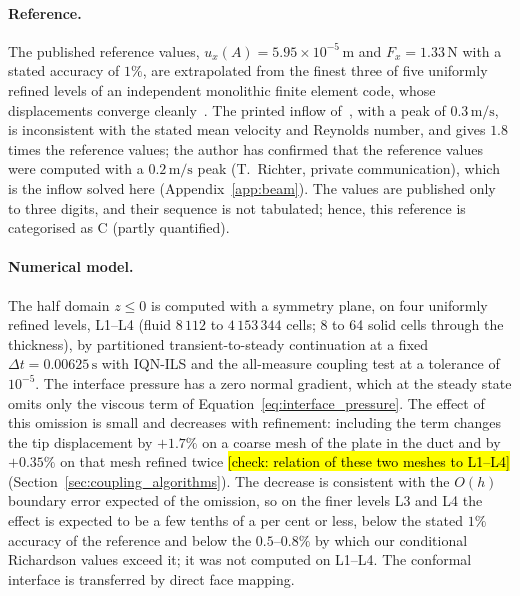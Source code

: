 \paragraph{Reference.}
The published reference values, $u_x(A) = 5.95\times10^{-5}\,\mathrm{m}$ and $F_x = 1.33\,\mathrm{N}$ with a stated accuracy of $1\%$, are extrapolated from the finest three of five uniformly refined levels of an independent monolithic finite element code, whose displacements converge cleanly~\citep{Richter2012}.
The printed inflow of~\citet{Richter2012}, with a peak of $0.3\,\mathrm{m/s}$, is inconsistent with the stated mean velocity and Reynolds number, and gives $1.8$ times the reference values; the author has confirmed that the reference values were computed with a $0.2\,\mathrm{m/s}$ peak (T.~Richter, private communication), which is the inflow solved here (Appendix~\ref{app:beam}).
The values are published only to three digits, and their sequence is not tabulated; hence, this reference is categorised as C (partly quantified).

\paragraph{Numerical model.}
The half domain $z \le 0$ is computed with a symmetry plane, on four uniformly refined levels, L1--L4 (fluid $8\,112$ to $4\,153\,344$ cells; 8 to 64 solid cells through the thickness), by partitioned transient-to-steady continuation at a fixed $\Delta t = 0.00625\,\mathrm{s}$ with IQN-ILS and the all-measure coupling test at a tolerance of $10^{-5}$.
The interface pressure has a zero normal gradient, which at the steady state omits only the viscous term of Equation~\eqref{eq:interface_pressure}. The effect of this omission is small and decreases with refinement: including the term changes the tip displacement by $+1.7\%$ on a coarse mesh of the plate in the duct and by $+0.35\%$ on that mesh refined twice \hl{[check: relation of these two meshes to L1--L4]} (Section~\ref{sec:coupling_algorithms}). The decrease is consistent with the $O(h)$ boundary error expected of the omission, so on the finer levels L3 and L4 the effect is expected to be a few tenths of a per cent or less, below the stated $1\%$ accuracy of the reference and below the $0.5$--$0.8\%$ by which our conditional Richardson values exceed it; it was not computed on L1--L4.
The conformal interface is transferred by direct face mapping.

